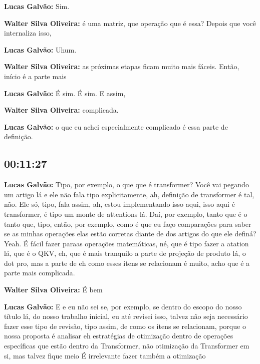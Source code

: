 \textbf{Lucas Galvão:} Sim.



\textbf{Walter Silva Oliveira:} é uma matriz, que operação que é essa? Depois que você internaliza isso,



\textbf{Lucas Galvão:} Uhum.



\textbf{Walter Silva Oliveira:} as próximas etapas ficam muito mais fáceis. Então, início é a parte mais



\textbf{Lucas Galvão:} É sim. É sim. E assim,



\textbf{Walter Silva Oliveira:} complicada.



\textbf{Lucas Galvão:} o que eu achei especialmente complicado é essa parte de definição.



\subsection{\textbf{00:11:27}}



\textbf{Lucas Galvão:} Tipo, por exemplo, o que que é transformer? Você vai pegando um artigo lá e ele não fala tipo explicitamente, ah, definição de transformer é tal, não. Ele só, tipo, fala assim, ah, estou implementando isso aqui, isso aqui é transformer, é tipo um monte de attentions lá. Daí, por exemplo, tanto que é o tanto que, tipo, então, por exemplo, como é que eu faço comparações para saber se as minhas operações elas estão corretas diante de dos artigos do que ele definá? Yeah. É fácil fazer paraas operações matemáticas, né, que é tipo fazer a atation lá, que é o QKV, eh, que é mais tranquilo a parte de projeção de produto lá, o dot pro, mas a parte de eh como esses itens se relacionam é muito, acho que é a parte mais complicada.



\textbf{Walter Silva Oliveira:} É bem



\textbf{Lucas Galvão:} E e eu não sei se, por exemplo, se dentro do escopo do nosso título lá, do nosso trabalho inicial, eu até revisei isso, talvez não seja necessário fazer esse tipo de revisão, tipo assim, de como os itens se relacionam, porque o nossa proposta é analisar eh estratégias de otimização dentro de operações específicas que estão dentro da Transformer, não otimização da Transformer em si, mas talvez fique meio É irrelevante fazer também a otimização



